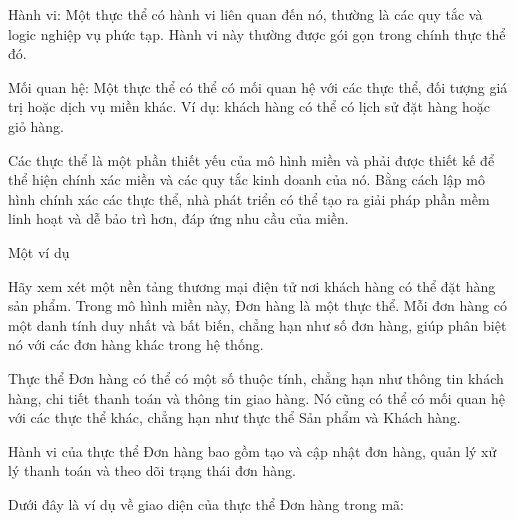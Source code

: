 Hành vi: Một thực thể có hành vi liên quan đến nó, thường là các quy tắc và logic nghiệp vụ phức tạp. Hành vi này thường được gói gọn trong chính thực thể đó.

Mối quan hệ: Một thực thể có thể có mối quan hệ với các thực thể, đối tượng giá trị hoặc dịch vụ miền khác. Ví dụ: khách hàng có thể có lịch sử đặt hàng hoặc giỏ hàng.

Các thực thể là một phần thiết yếu của mô hình miền và phải được thiết kế để thể hiện chính xác miền và các quy tắc kinh doanh của nó. Bằng cách lập mô hình chính xác các thực thể, nhà phát triển có thể tạo ra giải pháp phần mềm linh hoạt và dễ bảo trì hơn, đáp ứng nhu cầu của miền.

Một ví dụ

Hãy xem xét một nền tảng thương mại điện tử nơi khách hàng có thể đặt hàng sản phẩm. Trong mô hình miền này, Đơn hàng là một thực thể. Mỗi đơn hàng có một danh tính duy nhất và bất biến, chẳng hạn như số đơn hàng, giúp phân biệt nó với các đơn hàng khác trong hệ thống.

Thực thể Đơn hàng có thể có một số thuộc tính, chẳng hạn như thông tin khách hàng, chi tiết thanh toán và thông tin giao hàng. Nó cũng có thể có mối quan hệ với các thực thể khác, chẳng hạn như thực thể Sản phẩm và Khách hàng.

Hành vi của thực thể Đơn hàng bao gồm tạo và cập nhật đơn hàng, quản lý xử lý thanh toán và theo dõi trạng thái đơn hàng.

Dưới đây là ví dụ về giao diện của thực thể Đơn hàng trong mã:

